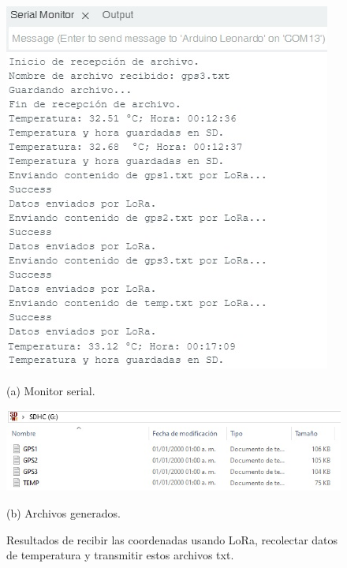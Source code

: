 \begin{itemize}
		\begin{figure}[H]
		\centering
		\begin{minipage}[b]{0.65\textwidth}
			\centering
			\includegraphics[width=\textwidth]{imagenes/data14}
			\caption*{(a) Monitor serial.}
		\end{minipage}
		\quad
		\begin{minipage}[b]{0.65\textwidth}
			\centering
			\includegraphics[width=\textwidth]{imagenes/data13}
			\caption*{(b) Archivos generados.}
		\end{minipage}
		\caption{ Resultados de recibir las coordenadas usando LoRa, recolectar datos de temperatura y transmitir estos archivos txt.}
		\label{fig:transmission_results}
	\end{figure}
	

\end{itemize}
